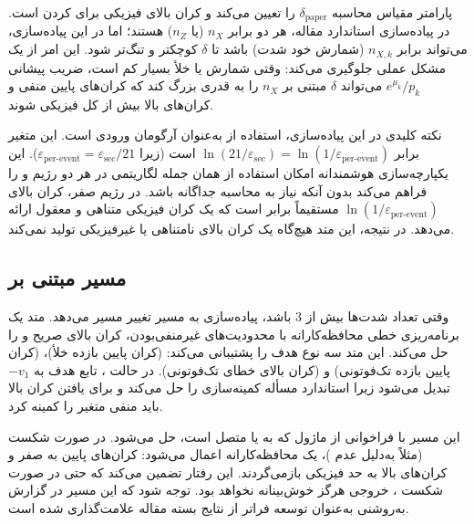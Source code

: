 پارامتر  مقیاس محاسبه $\delta_{\text{paper}}$ را تعیین می‌کند و  کران بالای فیزیکی برای  کردن است. در پیاده‌سازی استاندارد مقاله، هر دو برابر $n_X$ (یا $n_Z$) هستند؛ اما در این پیاده‌سازی،  می‌تواند برابر $n_{X,k}$ (شمارش خود شدت) باشد تا $\delta$ کوچکتر و تنگ‌تر شود. این امر از یک مشکل عملی جلوگیری می‌کند: وقتی شمارش  یا خلأ بسیار کم است، ضریب پیشانی $e^{\mu_k}/p_k$ می‌تواند $\delta$ مبتنی بر $n_X$ را به قدری بزرگ کند که کران‌های پایین منفی و کران‌های بالا بیش از کل فیزیکی شوند.

نکته کلیدی در این پیاده‌سازی، استفاده از  به‌عنوان آرگومان ورودی است. این متغیر برابر $\ln(21/\varepsilon_{\text{sec}}) = \ln(1/\varepsilon_{\text{per-event}})$ است (زیرا $\varepsilon_{\text{per-event}} = \varepsilon_{\text{sec}}/21$). این یکپارچه‌سازی هوشمندانه امکان استفاده از همان جمله لگاریتمی در هر دو رژیم  و  را فراهم می‌کند بدون آنکه نیاز به محاسبه جداگانه باشد. در رژیم صفر، کران بالای $\ln(1/\varepsilon_{\text{per-event}})$ مستقیماً برابر  است که یک کران فیزیکی متناهی و معقول ارائه می‌دهد. در نتیجه، این متد هیچ‌گاه یک کران بالای نامتناهی یا غیرفیزیکی تولید نمی‌کند.

\subsection{مسیر  مبتنی بر }

وقتی تعداد شدت‌ها بیش از 3 باشد، پیاده‌سازی به مسیر  تغییر مسیر می‌دهد. متد  یک برنامه‌ریزی خطی محافظه‌کارانه با محدودیت‌های غیرمنفی‌بودن، کران بالای صریح و  را حل می‌کند. این متد سه نوع هدف را پشتیبانی می‌کند:  (کران پایین بازده خلأ)،  (کران پایین بازده تک‌فوتونی) و  (کران بالای خطای تک‌فوتونی). در حالت ، تابع هدف به $-v_1$ تبدیل می‌شود زیرا  استاندارد مسأله کمینه‌سازی را حل می‌کند و برای یافتن کران بالا باید منفی متغیر را کمینه کرد.

این مسیر با فراخوانی  از ماژول  که به  یا  متصل است، حل می‌شود. در صورت شکست  (مثلاً به‌دلیل عدم )، یک  محافظه‌کارانه اعمال می‌شود: کران‌های پایین به صفر و کران‌های بالا به حد فیزیکی بازمی‌گردند. این رفتار  تضمین می‌کند که حتی در صورت شکست ، خروجی هرگز خوش‌بینانه نخواهد بود. توجه شود که این مسیر در گزارش  به‌روشنی به‌عنوان توسعه فراتر از نتایج بسته مقاله علامت‌گذاری شده است.

